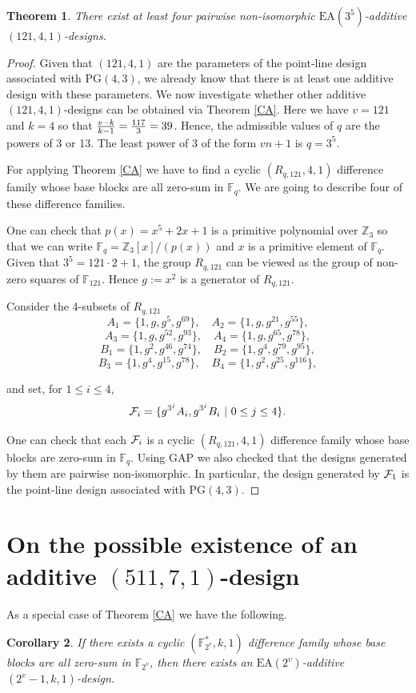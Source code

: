 \documentclass[a4paper, 11pt]{article}
\newtheorem{theorem}{Theorem}[section]
\newtheorem{corollary}[theorem]{Corollary}
\theoremstyle{definition}
\theoremstyle{definition}
\theoremstyle{definition}
\newcommand{\Z}{\mathbb{Z}}
\newcommand{\F}{\mathbb{F}}
\numberwithin{equation}{section}
\begin{document}
\begin{theorem} There exist at least four pairwise non-isomorphic $\mathrm{EA}(3^5)$-additive $(121,4,1)$-designs.
\end{theorem}
\begin{proof}
Given that $(121,4,1)$ are the parameters of the point-line design associated with $\mathrm{PG}(4,3)$,
we already know that there is at least one additive design with these parameters.
We now investigate whether other additive $(121,4,1)$-designs can be obtained via Theorem \ref{CA}.
Here we have $v=121$ and $k=4$ so that ${v-k\over k-1}={117\over3}=39$. Hence, the admissible values of $q$
are the powers of 3 or 13. The least power of 3 of the form $vn+1$ is $q=3^5$.

For applying Theorem \ref{CA} we have to find a cyclic $(R_{q,121},4,1)$ difference family
whose base blocks are all zero-sum in $\F_{q}$.
We are going to describe four of these difference families.

One can check that  $p(x)=x^5+2x+1$ is a primitive
polynomial over $\Z_3$ so that we can write $\F_q=\Z_3[x]/(p(x))$ and $x$ is a primitive element of $\F_q$.
Given that  $3^5=121\cdot 2+1$, the group $R_{q,121}$ can be viewed as the group of non-zero squares
of $\F_{121}$. Hence $g:=x^2$ is a generator of $R_{q,121}$.

Consider the 4-subsets of $R_{q,121}$
$$A_1=\{1,g,g^{5},g^{69}\},\quad A_2=\{1,g,g^{21},g^{55}\},$$
$$A_3=\{1,g,g^{52},g^{93}\},\quad A_4=\{1,g,g^{65},g^{78}\},$$
$$B_1=\{1,g^2,g^{46},g^{74}\},\quad B_2=\{1,g^4,g^{79},g^{95}\},$$
$$B_3=\{1,g^4,g^{15},g^{78}\},\quad B_4=\{1,g^2,g^{25},g^{116}\},$$

and set, for $1\leq i\leq 4$, 
$${\cal F}_i=\{g^{3^j}A_i, g^{3^j}B_i \ | \ 0\leq j\leq 4\}.$$

One can check that each ${\cal F}_i$ is a cyclic $(R_{q,121},4,1)$ difference family
whose base blocks are zero-sum in $\F_q$.
Using GAP \cite{Gap} we also checked that the designs generated by them are
pairwise non-isomorphic. In particular, the design generated by ${\cal F}_1$ is
the point-line design associated with $\mathrm{PG}(4,3)$.
\end{proof}



\section{On the possible existence of an additive $(511,7,1)$-design}

As a special case of Theorem \ref{CA} we have the following.
\begin{corollary}\label{2analogalike}
If there exists a cyclic $(\F_{2^v}^*,k,1)$ difference family whose base blocks are all zero-sum
in $\F_{2^v}$, then there exists an $\mathrm{EA}(2^v)$-additive $(2^v-1,k,1)$-design.
\end{corollary}
\end{document}
